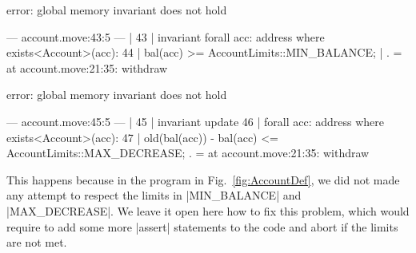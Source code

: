 \begin{MoveDiag}
error: global memory invariant does not hold

    --- account.move:43:5 ---
    |
 43 | invariant forall acc: address where exists<Account>(acc):
 44 |     bal(acc) >= AccountLimits::MIN_BALANCE;
    |
    .
    =     at account.move:21:35: withdraw

error: global memory invariant does not hold

    --- account.move:45:5 ---
    |
 45 | invariant update
 46 |   forall acc: address where exists<Account>(acc):
 47 |     old(bal(acc)) - bal(acc) <= AccountLimits::MAX_DECREASE;
    .
    =     at account.move:21:35: withdraw
\end{MoveDiag}

\noindent This happens because in the program in Fig.~\ref{fig:AccountDef}, we
did not made any attempt to respect the limits in |MIN_BALANCE| and
|MAX_DECREASE|. We leave it open here how to fix this problem, which would
require to add some more |assert| statements to the code and abort if the limits
are not met.

